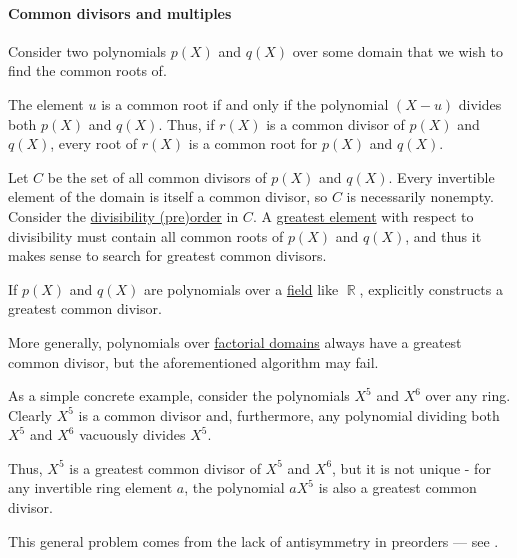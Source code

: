 \paragraph{Common divisors and multiples}

\begin{example}\label{ex:common_polynomial_divisors}
  Consider two polynomials \( p(X) \) and \( q(X) \) over some domain that we wish to find the common roots of.

  The element \( u \) is a common root if and only if the polynomial \( (X - u) \) divides both \( p(X) \) and \( q(X) \). Thus, if \( r(X) \) is a common divisor of \( p(X) \) and \( q(X) \), every root of \( r(X) \) is a common root for \( p(X) \) and \( q(X) \).

  Let \( C \) be the set of all common divisors of \( p(X) \) and \( q(X) \). Every invertible element of the domain is itself a common divisor, so \( C \) is necessarily nonempty. Consider the \hyperref[thm:semiring_divisibility_order]{divisibility (pre)order} in \( C \). A \hyperref[def:extremal_points/greatest_and_least]{greatest element} with respect to divisibility must contain all common roots of \( p(X) \) and \( q(X) \), and thus it makes sense to search for greatest common divisors.

  \begin{thmenum}
     If \( p(X) \) and \( q(X) \) are polynomials over a \hyperref[def:field]{field} like \( \BbbR \),  explicitly constructs a greatest common divisor.

     More generally, polynomials over \hyperref[def:factorial_domain]{factorial domains} always have a greatest common divisor, but the aforementioned algorithm may fail.

     As a simple concrete example, consider the polynomials \( X^5 \) and \( X^6 \) over any ring. Clearly \( X^5 \) is a common divisor and, furthermore, any polynomial dividing both \( X^5 \) and \( X^6 \) vacuously divides \( X^5 \).

    Thus, \( X^5 \) is a greatest common divisor of \( X^5 \) and \( X^6 \), but it is not unique - for any invertible ring element \( a \), the polynomial \( a X^5 \) is also a greatest common divisor.

    This general problem comes from the lack of antisymmetry in preorders --- see .


\end{thmenum}
\end{example}
